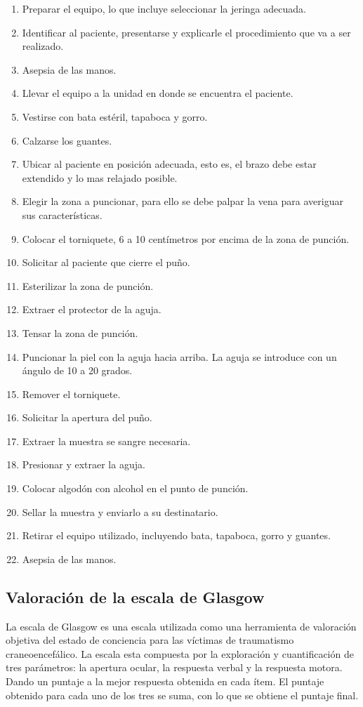 \begin{enumerate}
\item Preparar el equipo, lo que incluye seleccionar la jeringa adecuada.
\item Identificar al paciente, presentarse y explicarle el procedimiento que va a ser realizado.
\item Asepsia de las manos.
\item Llevar el equipo a la unidad en donde se encuentra el paciente.
\item Vestirse con bata estéril, tapaboca y gorro.
\item Calzarse los guantes.
\item Ubicar al paciente en posición adecuada, esto es, el brazo debe estar extendido y lo mas relajado 
posible.
\item Elegir la zona a puncionar, para ello se debe palpar la vena para averiguar sus características.
\item Colocar el torniquete, 6 a 10 centímetros por encima de la zona de punción.
\item Solicitar al paciente que cierre el puño.
\item Esterilizar la zona de punción.
\item Extraer el protector de la aguja.
\item Tensar la zona de punción.
\item Puncionar la piel con la aguja hacia arriba. La aguja se introduce con un ángulo de 10 a 20 grados.
\item Remover el torniquete.
\item Solicitar la apertura del puño.
\item Extraer la muestra se sangre necesaria.
\item Presionar y extraer la aguja.
\item Colocar algodón con alcohol en el punto de punción.
\item Sellar la muestra y enviarlo a su destinatario.
\item Retirar el equipo utilizado, incluyendo bata, tapaboca, gorro y guantes.
\item Asepsia de las manos.
\end{enumerate}


\subsection{Valoración de la escala de Glasgow}

La escala de Glasgow es una escala utilizada como una herramienta de valoración objetiva del estado de conciencia para las víctimas de traumatismo craneoencefálico. La escala esta compuesta por la exploración
y cuantificación de tres parámetros: la apertura ocular, la respuesta verbal y la respuesta motora. Dando 
un puntaje a la mejor respuesta obtenida en cada ítem. El puntaje obtenido para cada uno de los
tres se suma, con lo que se obtiene el puntaje final.


